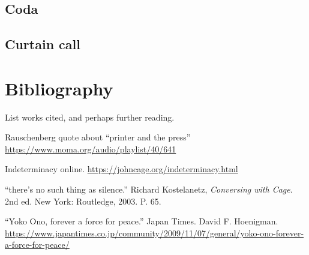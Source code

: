 \newpage

\subsection{Coda} %













\newpage

\subsection{Curtain call}



\newpage

\section{Bibliography}

List works cited, and perhaps further reading.

Rauschenberg quote about ``printer and the press'' \url{https://www.moma.org/audio/playlist/40/641}

Indeterminacy online.  \url{https://johncage.org/indeterminacy.html}

``there's no such thing as silence.''  Richard Kostelanetz, \textit{Conversing with Cage}.  2nd ed.  New York: Routledge, 2003.  P. 65.

``Yoko Ono, forever a force for peace.'' Japan Times.  David F. Hoenigman.  \url{https://www.japantimes.co.jp/community/2009/11/07/general/yoko-ono-forever-a-force-for-peace/}

